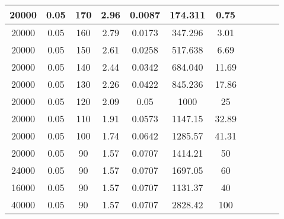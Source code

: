 \begin{tabular}{| c | c | c | c | c | c | c | c | c | c | c |}
	20000   & 0.05  & 170            & 2.96           & 0.0087  & 174.311 & 0.75    \\ \hline %
	20000   & 0.05  & 160            & 2.79           & 0.0173  & 347.296 & 3.01    \\ \hline %
	20000   & 0.05  & 150            & 2.61           & 0.0258  & 517.638 & 6.69    \\ \hline %
	20000   & 0.05  & 140            & 2.44           & 0.0342  & 684.040 & 11.69   \\ \hline %
	20000   & 0.05  & 130            & 2.26           & 0.0422  & 845.236 & 17.86   \\ \hline %
	20000   & 0.05  & 120            & 2.09           & 0.05    & 1000    & 25      \\ \hline %
	20000   & 0.05  & 110            & 1.91           & 0.0573  & 1147.15 & 32.89   \\ \hline %
	20000   & 0.05  & 100            & 1.74           & 0.0642  & 1285.57 & 41.31   \\ \hline %
	20000   & 0.05  & 90             & 1.57           & 0.0707  & 1414.21 & 50      \\ \hline %
	24000   & 0.05  & 90             & 1.57           & 0.0707  & 1697.05 & 60      \\ \hline %
	16000   & 0.05  & 90             & 1.57           & 0.0707  & 1131.37 & 40      \\ \hline %
	40000   & 0.05  & 90             & 1.57           & 0.0707  & 2828.42 & 100     \\ \hline %
\end{tabular}
